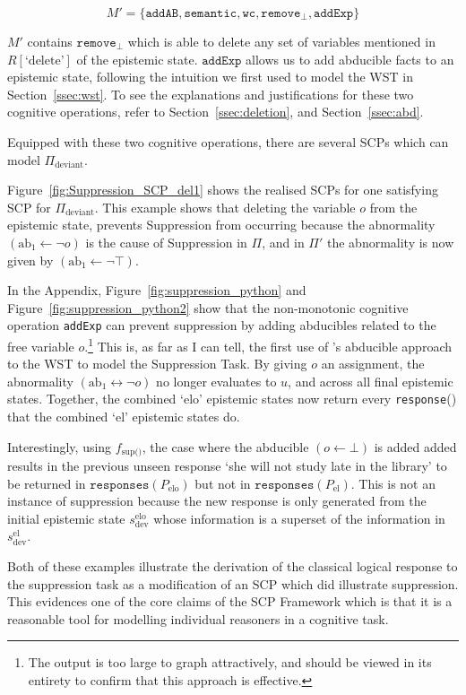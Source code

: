 \[M'=\{\texttt{addAB}, \texttt{semantic}, \texttt{wc}, \texttt{remove}_\bot, \texttt{addExp}\}\]

$M'$ contains $\texttt{remove}_\bot$ which is able to delete any set of variables mentioned in $R[\text{`delete'}]$ of the epistemic state. $\texttt{addExp}$ allows us to add abducible facts to an epistemic state, following the intuition we first used to model the WST in Section~\ref{ssec:wst}. To see the explanations and justifications for these two cognitive operations, refer to Section~\ref{ssec:deletion}, and Section~\ref{ssec:abd}.

Equipped with these two cognitive operations, there are several SCPs which can model $\Pi_\text{deviant}$.

Figure~\ref{fig:Suppression_SCP_del1} shows the realised SCPs for one satisfying SCP for $\Pi_\text{deviant}$. This example shows that deleting the variable $o$ from the epistemic state, prevents Suppression from occurring because the abnormality $(\text{ab}_1 \leftarrow \lnot o )$ is the cause of Suppression in $\Pi$, and in $\Pi'$ the abnormality is now given by $(\text{ab}_1 \leftarrow \lnot \top )$.

In the Appendix, Figure~\ref{fig:suppression_python} and Figure~\ref{fig:suppression_python2}  show that the non-monotonic cognitive operation \texttt{addExp} can prevent suppression by adding abducibles related to the  free variable $o$.\footnote{The output is too large to graph attractively, and should be viewed in its entirety to confirm that this approach is effective.} This is, as far as I can tell, the first use of \cite{holldobler2015weak}'s abducible approach to the WST to model the Suppression Task. By giving $o$ an assignment, the abnormality $(\text{ab}_1\leftrightarrow \lnot o)$ no longer evaluates to $u$, and across all final epistemic states. Together, the combined `elo' epistemic states now return every \texttt{response}() that the combined `el' epistemic states do. 

Interestingly, using $f_\text{sup()}$, the case where the abducible $(o \leftarrow \bot)$ is added added results in the previous unseen response `she will not study late in the library' to be returned in $\texttt{responses}(P_\text{elo})$ but not in $\texttt{responses}(P_\text{el})$. This is not an instance of suppression because the new response is only generated from the initial epistemic state $s_\text{dev}^\text{elo}$ whose information is a superset of the information in $s_\text{dev}^\text{el}$.

Both of these examples illustrate the derivation of the classical logical response to the suppression task as a modification of an SCP which did illustrate suppression. This evidences one of the core claims of the SCP Framework which is that it is a reasonable tool for modelling individual reasoners in a cognitive task. 

